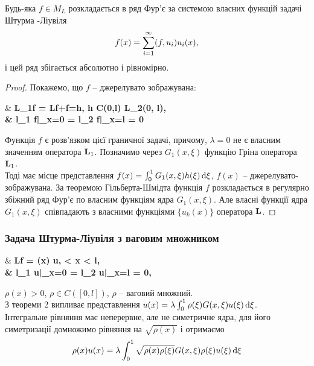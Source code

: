\begin{theorem}
	Будь-яка $f \in M_L$ розкладається в ряд Фур’є за системою власних функцій задачі Штурма -Ліувіля
	\begin{equation}
		\label{eq:5.18}
		f(x) = \Sum_{i=1}^\infty (f, u_i) u_i(x),
	\end{equation} 
	і цей ряд збігається абсолютно і рівномірно.
\end{theorem}

\begin{proof}
	Покажемо, що $f$ -- джерелувато зображувана:
	\begin{system*}
		& \bf{L}_1f = \bf{L}f+f=h, \quad h \in C(0,l) \cap L_2(0, l), \\
		& l_1 f|_{x=0} = l_2 f|_{x=l} = 0
	\end{system*}

	Функція $f$ є розв’язком цієї граничної задачі, причому, $\lambda = 0$ не є власним значенням оператора $\bf{L}_1$. Позначимо через $G_1(x, \xi)$ функцію Гріна оператора $\bf{L}_1$. \\

	Тоді має місце представлення $f(x) = \int_0^1 G_1(x, \xi) h(\xi) \diff \xi$, $f(x)$ -- джерелувато-зображувана. За теоремою Гільберта-Шмідта функція $f$ розкладається в регулярно збіжний ряд Фур’є по власним функціям ядра $G_1(x, \xi)$. Але власні функції ядра $G_1(x, \xi)$ співпадають з власними функціями $\{u_k(x)\}$ оператора $\bf{L}$.
\end{proof}

\subsubsection{Задача Штурма-Ліувіля з ваговим множником}

\begin{system}
	\label{eq:5.19}
	& \bf{L}f = \lambda \rho(x) u,  < x < l, \\
	& l_1 u|_{x=0} = l_2 u|_{x=l} = 0,
\end{system}
$\rho(x) > 0$, $\rho \in C([0, l])$, $\rho$ -- ваговий множний. \\

З теореми 2 випливає представлення $u(x) = \lambda \int_0^1 \rho(\xi) G(x, \xi) u(\xi) \diff \xi$. \\

Інтегральне рівняння має неперервне, але не симетричне ядра, для його симетризації домножимо рівняння на $\sqrt{\rho(x)}$ і отримаємо
\begin{equation}
	\label{eq:5.20}
	\rho(x)u(x) = \lambda \int_0^1 \sqrt{\rho(x)\rho(\xi)} G(x, \xi) \rho(\xi)u(\xi) \diff \xi
\end{equation}

